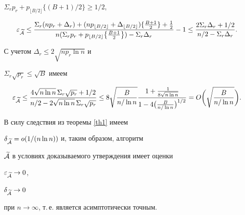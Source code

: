 \begin{pf}
$\Sigma_{r}p_{r}+p_{\lfloor B/2 \rfloor} \{ (B+1)/2 \}\ge 1/2$,


$$


\varepsilon_{\widetilde{ \cal A}} \le


\frac


{\Sigma_{r} (np_{r}+\Delta _{r})+


(np_{\lfloor B/2 \rfloor} + \Delta _{\lfloor B/2 \rfloor})


\{ \frac {B+1}{2}\} + \frac {1}{2}}


{n (\Sigma_{r} p_{r}+p_{\lfloor B/2 \rfloor }


\bigl\{\frac {B+1}{2}\bigr\}) - \Sigma_{r} \Delta _{r}}


%


-1 \le 


\frac{2 \Sigma_{r} \Delta _{r}+1/2}{n/2 - \Sigma_{r} \Delta _{r}}.


$$


С учетом $\Delta _{r}\le 2\sqrt {np_{r}\ln n}$ и


$\Sigma_{r}\sqrt{p_{r}}\le \sqrt{B}$ имеем


$$


\varepsilon_{\widetilde{ \cal A}} \le


\frac{4 \sqrt {n \ln n}\, \Sigma _{r} \sqrt {p_{r}}+1/2 }


{ n/2 - 2 \sqrt {n \ln n}\, \Sigma _{r} \sqrt {p_{r}} } \le


8\sqrt {\frac {B}{n/\ln n}}


\frac{1+ \frac {1}{8 \sqrt {n\ln n}}}


{1-4\bigl( \frac {B}{n/\ln n} \bigr)^{1/2}}


= O \biggl(\sqrt {\frac {B}{n/\ln n}}\biggr).


$$





В силу следствия из теоремы \ref{th1} имеем


$\delta_{\widetilde{ \cal A}}=o(1/(n \ln n))$ и, таким образом, алгоритм


$\widetilde{ \cal A}$ в условиях доказываемого утверждения имеет оценки


$\varepsilon_{\widetilde { \cal A}} \to 0$,


$\delta_{\widetilde { \cal A}} \to 0$


при $n \to \infty $, т.\,е. является асимптотически точным.


\end{pf}





